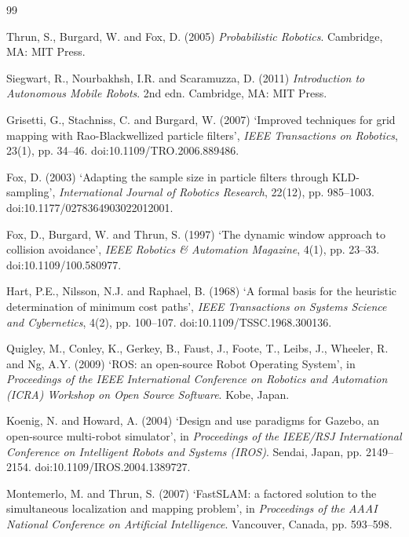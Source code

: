 \documentclass[12pt,letterpaper]{article}
\begin{document}
\begin{thebibliography}{99}

Thrun, S., Burgard, W. and Fox, D. (2005) \textit{Probabilistic Robotics}. Cambridge, MA: MIT Press.

Siegwart, R., Nourbakhsh, I.R. and Scaramuzza, D. (2011) \textit{Introduction to Autonomous Mobile Robots}. 2nd edn. Cambridge, MA: MIT Press.

Grisetti, G., Stachniss, C. and Burgard, W. (2007) `Improved techniques for grid mapping with Rao-Blackwellized particle filters', \textit{IEEE Transactions on Robotics}, 23(1), pp. 34--46. doi:10.1109/TRO.2006.889486.

Fox, D. (2003) `Adapting the sample size in particle filters through KLD-sampling', \textit{International Journal of Robotics Research}, 22(12), pp. 985--1003. doi:10.1177/0278364903022012001.

Fox, D., Burgard, W. and Thrun, S. (1997) `The dynamic window approach to collision avoidance', \textit{IEEE Robotics \& Automation Magazine}, 4(1), pp. 23--33. doi:10.1109/100.580977.

Hart, P.E., Nilsson, N.J. and Raphael, B. (1968) `A formal basis for the heuristic determination of minimum cost paths', \textit{IEEE Transactions on Systems Science and Cybernetics}, 4(2), pp. 100--107. doi:10.1109/TSSC.1968.300136.

Quigley, M., Conley, K., Gerkey, B., Faust, J., Foote, T., Leibs, J., Wheeler, R. and Ng, A.Y. (2009) `ROS: an open-source Robot Operating System', in \textit{Proceedings of the IEEE International Conference on Robotics and Automation (ICRA) Workshop on Open Source Software}. Kobe, Japan.

Koenig, N. and Howard, A. (2004) `Design and use paradigms for Gazebo, an open-source multi-robot simulator', in \textit{Proceedings of the IEEE/RSJ International Conference on Intelligent Robots and Systems (IROS)}. Sendai, Japan, pp. 2149--2154. doi:10.1109/IROS.2004.1389727.

Montemerlo, M. and Thrun, S. (2007) `FastSLAM: a factored solution to the simultaneous localization and mapping problem', in \textit{Proceedings of the AAAI National Conference on Artificial Intelligence}. Vancouver, Canada, pp. 593--598.


\end{thebibliography}
\end{document}

